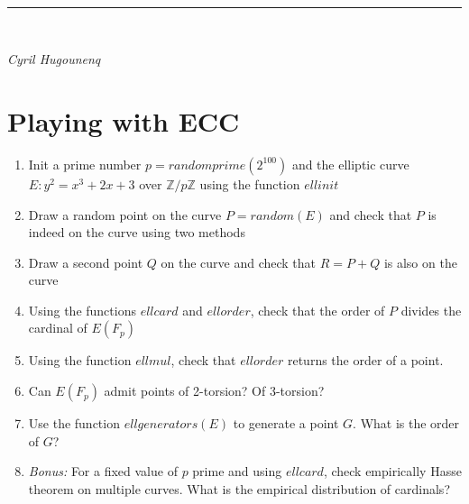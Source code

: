 \documentclass[12pt]{article}
\begin{document}
\begin{minipage}{.3\textwidth}%
\end{minipage} \hfill
{}\\\hrule \ \\
\begin{minipage}[t]{0.5\textwidth}\sf\textit{Cyril Hugounenq}
\end{minipage} \hfill%
\vspace{0.5em}

\section{Playing with ECC}
\begin{enumerate}
	\item Init a prime number $p=randomprime(2^{100})$ and the elliptic curve $E:y^2=x^3+2x+3$ over $\mathbb{Z}/p\mathbb{Z}$ using the function $ellinit$
	\item Draw a random point on the curve $P=random(E)$ and check that $P$ is indeed on the curve using two methods
	\item Draw a second point $Q$ on the curve and check that $R=P+Q$ is also on the curve
	\item Using the functions $ellcard$ and $ellorder$, check that the order of $P$ divides the cardinal of $E(F_p)$
	\item Using the function $ellmul$, check that $ellorder$ returns the order of a point.
	\item Can $E(F_p)$ admit points of 2-torsion? Of 3-torsion?
	\item Use the function $ellgenerators(E)$ to generate a point $G$. What is the order of $G$?
	\item {\it Bonus:} For a fixed value of $p$ prime and using $ellcard$, check empirically Hasse theorem on multiple curves. What is the empirical distribution of cardinals?
\end{enumerate}
\end{document}
